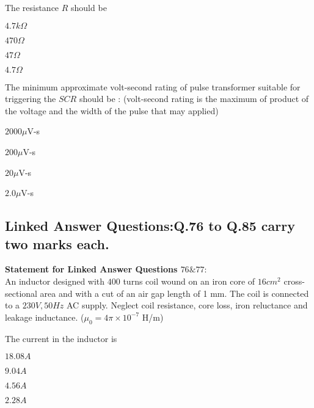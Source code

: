   \item [74.] The resistance $R$ should be
\begin{enumerate}
\begin{multicols}{4}
    \item $4.7 k\Omega$
    \item $470 \Omega$
    \item $47 \Omega$
    \item $4.7 \Omega$
    \end{multicols}
\end{enumerate}  
    \item [75.] The minimum approximate volt-second rating of pulse transformer suitable for triggering the $SCR$ should be : (volt-second rating is the maximum of product of the voltage and the width of the pulse that may applied)
      \begin{enumerate}    
        \begin{multicols}{4}
                \item $2000 \mu$V-s
                \item $200 \mu$V-s
                \item $20 \mu$V-s
                \item $2.0 \mu$V-s
                \end{multicols}
              \end{enumerate}   
\subsection{Linked Answer Questions:Q.76 to Q.85 carry two marks each.}              
 \textbf{Statement for Linked Answer Questions $76\&77:$} \\        
 An inductor designed with $400$ turns coil wound on an iron core of $16 cm^2$ cross-sectional area and with a cut of an air gap length of 1 mm. The coil is connected to a $230 V, 50 Hz$ AC supply. Neglect coil resistance, core loss, iron reluctance and leakage inductance. ($\mu_0 = 4\pi \times 10^{-7}$ H/m)
    \item [76.] The current in the inductor is
    \begin{enumerate}
    \begin{multicols}{4}
        \item $18.08 A$
        \item $9.04 A$
        \item $4.56 A$
        \item $2.28 A$
        \end{multicols}
    \end{enumerate}
    
